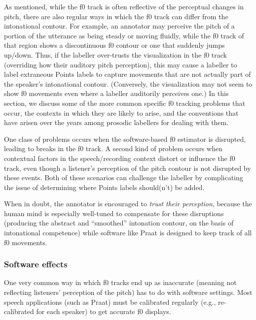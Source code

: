 \documentclass[11pt, twoside]{memoir}
\begin{document}
As mentioned, while the f0 track is often reflective of the perceptual changes in pitch, there are also regular ways in which the f0 track can differ from the intonational contour. For example, an annotator may perceive the pitch of a portion of the utterance as being steady or moving fluidly, while the f0 track of that region shows a discontinuous f0 contour or one that suddenly jumps up\slash down. Thus, if the labeller over-trusts the visualization in the f0 track (overriding how their auditory pitch perception), this may cause a labeller to label extraneous Points labels to capture movements that are not actually part of the speaker’s intonational contour. (Conversely, the visualization may not seem to show f0 movements even where a labeller auditorily perceives one.) In this section, we discuss some of the more common specific f0 tracking problems that occur, the contexts in which they are likely to arise, and the conventions that have arisen over the years among prosodic labellers for dealing with them.

One class of problems occurs when the software-based f0 estimator is disrupted, leading to breaks in the f0 track. A second kind of problem occurs when contextual factors in the speech\slash recording context distort or influence the f0 track, even though a listener’s perception of the pitch contour is not disrupted by these events. Both of these scenarios can challenge the labeller by complicating the issue of determining where Points labels should(n’t) be added.

When in doubt, the annotator is encouraged to \emph{trust their perception}, because the human mind is especially well-tuned to compensate for these disruptions (producing the abstract and “smoothed” intonation contour, on the basis of intonational competence) while software like Praat is designed to keep track of all f0 movements.

\subsubsection{Software effects}\label{sec:software-effects}

One very common way in which f0 tracks end up as inaccurate (meaning not reflecting listeners’ perception of the pitch) has to do with software settings. Most speech applications (such as Praat) must be calibrated regularly (e.g., re-calibrated for each speaker) to get accurate f0 displays.
\end{document}
